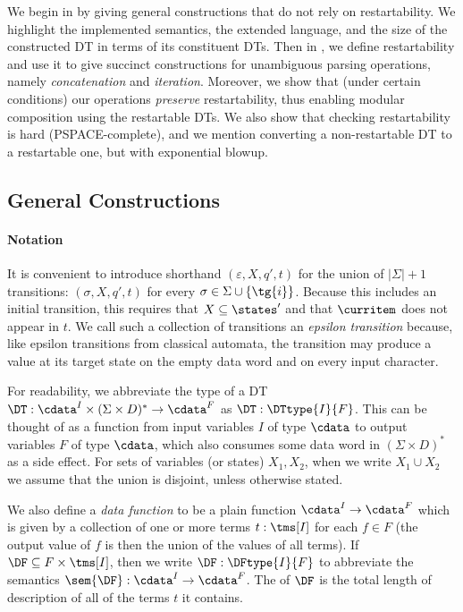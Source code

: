 We begin in  by giving general constructions that do not rely on restartability. We highlight the implemented semantics, the extended language, and the size of the constructed DT in terms of its constituent DTs.
Then in , we define restartability and use it to give succinct constructions for unambiguous parsing operations, namely \emph{concatenation} and \emph{iteration}.
Moreover, we show that (under certain conditions) our operations \emph{preserve} restartability, thus enabling modular composition using the restartable DTs. We also show that checking restartability is hard (PSPACE-complete), and we mention converting a non-restartable DT to a restartable one, but with exponential blowup.

\subsection{General Constructions}
\label{dt:subsec:constructions-general}

\paragraph*{Notation}
It is convenient to introduce shorthand $(\varepsilon, X, q', t)$ for the union of $|\Sigma| + 1$ transitions: $(\sigma, X, q', t)$ for every $\sigma \in \Sigma \cup \{{\tg{i}}\}$. Because this includes an initial transition, this requires that $X \subseteq \states'$ and that $\curritem$ does not appear in $t$. We call such a collection of transitions an \emph{epsilon transition} because, like epsilon transitions from classical automata, the transition may produce a value at its target state on the empty data word and on every input character.

For readability, we abbreviate the type of a DT
$\DT: \cdata^I \times (\Sigma \times D)^* \to \cdata^F$ as $\DT: \DTtype{I}{F}$.
This can be thought of as a function from input variables $I$ of type $\cdata$ to output variables $F$ of type $\cdata$, which also consumes some data word in $(\Sigma \times D)^*$ as a side effect.
For sets of variables (or states) $X_1, X_2$, when we write $X_1 \cup X_2$ we assume that the union is disjoint, unless otherwise stated.

We also define a \emph{data function} to be a plain function $\cdata^I \to \cdata^F$ which is
given by a collection of one or more terms $t : \tms[I]$ for each $f \in F$ (the output value of $f$ is then the union of the values of all terms). If $\DF \subseteq F \times \tms[I]$, then we write $\DF: \DFtype{I}{F}$ to abbreviate the semantics $\sem{\DF}: \cdata^I \to \cdata^F$.
The  of $\DF$ is the total length of description of all of the terms $t$ it contains.

